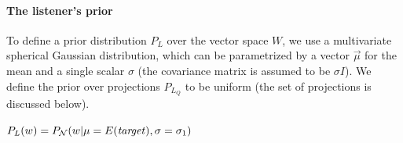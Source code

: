 \documentclass[9pt,twocolumn,twoside,lineno]{pnas-new}
\begin{document}

	





		
	







	\paragraph{The listener's prior} 

		To define a prior distribution $P_L$ over the vector space $W$, we use a multivariate spherical Gaussian distribution, which can be parametrized by a vector $\overrightarrow{\mu}$ for the mean and a single scalar $\sigma$ (the covariance matrix is assumed to be $\sigma I$). We define the prior over projections $P_{L_Q}$ to be uniform (the set of projections is discussed below).

		\begin{examples}
		
		\item $P_L(w) = P_{\mathcal{N}}(w\vert\mu=E(\textrm{\emph{target}}),\sigma=\sigma_1)$ \label{vect:prior}
		\end{examples}
\end{document}

